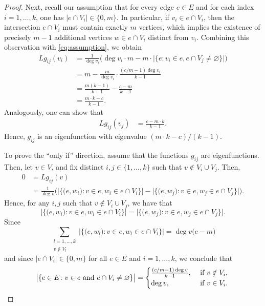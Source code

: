 \documentclass{article}
\theoremstyle{plain}
\theoremstyle{definition}
\theoremstyle{remark}
\begin{document}
\begin{proof}
    Next, recall our assumption that for every edge $e \in E$ and for each index $i = 1,\ldots,k$, one has $\lvert e \cap V_i \rvert \in \{0,m\}$. In particular, if $v_i \in e \cap V_i$, then the intersection $e \cap V_i$ must contain exactly $m$ vertices, which implies the existence of precisely $m-1$ additional vertices $w \in e \cap V_i$ distinct from $v_i$. Combining this observation with \eqref{eq:assumption}, we obtain
    \begin{align*}
        Lg_{ij}(v_i) &= \frac 1{\deg v_i}\bigl(\deg v_i\cdot m - m\cdot \bigl|\bigl\{e\colon v_i\in e, e\cap V_j\neq \varnothing\bigr\}\bigr|\bigr)\\
        &=m - \frac{m}{\deg v_i}\cdot \frac{(c/m-1)\deg v_i}{k-1}\\
        &= \frac{m(k-1)}{k-1}-\frac{c-m}{k-1}\\
        &=\frac{m\cdot k-c}{k-1}.
    \end{align*}
    Analogously, one can show that
    \begin{align*}
        Lg_{ij}(v_j) &= \frac{c-m\cdot k}{k-1}.
    \end{align*}
    Hence, $g_{ij}$ is an eigenfunction with eigenvalue $(m\cdot k-c)/(k-1)$.\newline 

    To prove the ``only if'' direction, assume that the functions $g_{ij}$ are eigenfunctions. Then, let $v\in V$, and fix distinct $i,j\in \{1,\ldots,k\}$ such that $v\notin V_i\cup V_j$. Then,
    \begin{align*}
        0 &= Lg_{ij}(v)\\
        &= \frac1{\deg v} \biggl( \bigl| \bigl\{\bigl(e,w_i\bigr)\colon v\in e, w_i \in e\cap V_i\bigr\}\bigr| - \bigl| \bigl\{\bigl(e,w_j\bigr)\colon v\in e, w_j \in e\cap V_j\bigr\}\bigr| \biggr).
    \end{align*}
    Hence, for any $i,j$ such that $v\notin V_i\cup V_j$, we have that
    \[
    \bigl| \bigl\{\bigl(e,w_i\bigr)\colon v\in e, w_i \in e\cap V_i\bigr\}\bigr| = \bigl| \bigl\{\bigl(e,w_j\bigr)\colon v\in e, w_j \in e\cap V_j\bigr\}\bigr|.
    \]
    Since
    \[
    \sum_{\substack{l=1,\ldots,k\\ v\notin V_l}}\bigl| \bigl\{\bigl(e,w_l\bigr)\colon v\in e, w_l \in e\cap V_l\bigr\}\bigr| = \deg v \bigl(c-m\bigr)
    \]
    and since $|e\cap V_i|\in \{0,m\}$ for all $e\in E$ and $i=1,\ldots,k$,
    we conclude that
    \[
    \bigl| \{e\in E \colon v\in e \text{ and } e\cap V_i \neq \varnothing\}\bigr| = \begin{cases}
        \frac{(c/m-1) \deg v}{k -1}, &\text{ if } v\notin V_i,\\
        \deg v, &\text{ if } v\in V_i. 
    \end{cases}\qedhere
    \]
\end{proof}
\end{document}
